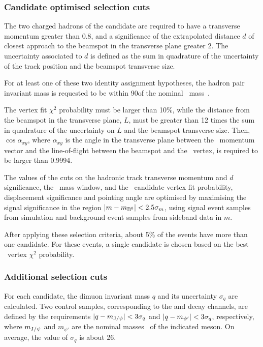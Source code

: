 \subsubsection{Candidate optimised selection cuts}
\label{sec:opt-selec}

The two charged hadrons of the candidate are required to have a transverse momentum greater than 0.8\GeV, and a significance of the extrapolated distance $d$ of closest approach to the beamspot in the transverse plane greater 2.
The uncertainty associated to $d$ is defined as the sum in quadrature of the uncertainty of the track position and the beamspot transverse size.

For at least one of these two identity assignment hypotheses, the hadron pair invariant mass is requested to be within 90\MeV of the nominal \cPKstz\ mass~\cite{PDG}.

The \PBz vertex fit $\chi^2$ probability must be larger than 10\%, while the distance from the beamspot in the transverse plane, $L$, must be greater than 12 times the sum in quadrature of the uncertainty on $L$ and the beamspot transverse size.
Then, $\cos{\alpha_{xy}}$, where $\alpha_{xy}$ is the angle in the transverse plane between the \PBz\ momentum vector and the line-of-flight between the beamspot and the \PBz\ vertex, is required to be larger than 0.9994.

The values of the cuts on the hadronic track transverse momentum and $d$ significance, the \cPKstz\ mass window, and the \PBz\ candidate vertex fit probability, displacement significance and pointing angle are optimised by maximising the signal significance in the region $\lvert m-m_{{\textrm{B}}{}^{0}}\rvert < 2.5\sigma_m$, using signal event samples from simulation and background event samples from sideband data in $m$.

After applying these selection criteria, about 5\% of the events have more than one candidate.
For these events, a single candidate is chosen based on the best \PBz\ vertex $\chi^2$ probability.

\subsubsection{Additional selection cuts}

For each candidate, the dimuon invariant mass $q$ and its uncertainty $\sigma_{q}$ are calculated.
Two control samples, corresponding to the \BtoKstJpsi and \BtoKstpsip decay channels, are defined by the requirements $\lvert q - m_{\textrm{J}/\psi}\rvert < 3\sigma_{q}$ and $\lvert q - m_{\psi'}\rvert < 3\sigma_{q}$, respectively, where $m_{\textrm{J}/\psi}$ and $m_{\psi'}$ are the nominal masses~\cite{PDG} of the indicated meson.
On average, the value of $\sigma_{q}$ is about 26\MeV.

